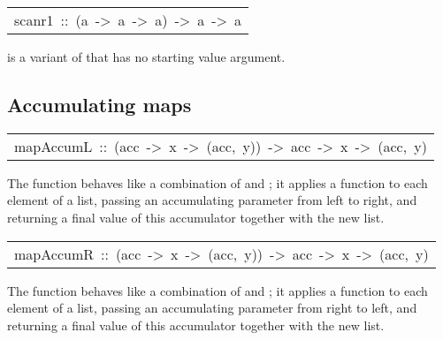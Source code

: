 \begin{haddockdesc}
\item[\begin{tabular}{@{}l}
scanr1\ ::\ (a\ ->\ a\ ->\ a)\ ->\ {\char 91}a{\char 93}\ ->\ {\char 91}a{\char 93}
\end{tabular}]\haddockbegindoc
{} is a variant of  that has no starting value argument.
\par

\end{haddockdesc}
\subsection{Accumulating maps
}
\begin{haddockdesc}
\item[\begin{tabular}{@{}l}
mapAccumL\ ::\ (acc\ ->\ x\ ->\ (acc,\ y))\ ->\ acc\ ->\ {\char 91}x{\char 93}\ ->\ (acc,\ {\char 91}y{\char 93})
\end{tabular}]\haddockbegindoc
The  function behaves like a combination of  and
 ; it applies a function to each element of a list, passing
 an accumulating parameter from left to right, and returning a final
 value of this accumulator together with the new list.
\par

\end{haddockdesc}
\begin{haddockdesc}
\item[\begin{tabular}{@{}l}
mapAccumR\ ::\ (acc\ ->\ x\ ->\ (acc,\ y))\ ->\ acc\ ->\ {\char 91}x{\char 93}\ ->\ (acc,\ {\char 91}y{\char 93})
\end{tabular}]\haddockbegindoc
The  function behaves like a combination of  and
 ; it applies a function to each element of a list, passing
 an accumulating parameter from right to left, and returning a final
 value of this accumulator together with the new list.
\par

\end{haddockdesc}
